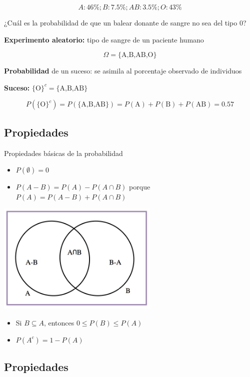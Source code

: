 \documentclass[]{book}
\begin{document}
\[A: 46\%; B: 7.5\%; AB: 3.5\%; O: 43\%\]

¿Cuál es la probabilidad de que un balear donante de sangre no sea del tipo 0?

\textbf{Experimento aleatorio:} tipo de sangre de un paciente humano

\[\Omega=\{\mbox{A,B,AB,O}\}\]

\textbf{Probabilidad} de un suceso: se asimila al porcentaje observado de individuos

\textbf{Suceso:} \(\{\mbox{O}\}^c=\{\mbox{A,B,AB}\}\)

\[P(\{\mbox{O}\}^c)\!=\!P(\{\mbox{A,B,AB}\})\!=\!
P(\mbox{A})+P (\mbox{B})+P(\mbox{AB})\!=\!0.57\]

\hypertarget{propiedades-8}{%
\subsection{Propiedades}\label{propiedades-8}}

Propiedades básicas de la probabilidad

\begin{itemize}
\item
  \(P(\emptyset)=0\)
\item
  \(P(A-B)=P(A)-P(A\cap B)\) porque \(P(A)=P(A-B)+P(A\cap B)\)
\end{itemize}

\includegraphics[width=\textwidth,height=2.08333in]{Images/proba1dibujos/A-B.jpg}

\begin{itemize}
\item
  Si \(B\subseteq A\), entonces \(0\leq P(B)\leq P(A)\)
\item
  \(P(A^c)=1-P(A)\)
\end{itemize}

\hypertarget{propiedades-9}{%
\subsection{Propiedades}\label{propiedades-9}}
\end{document}
